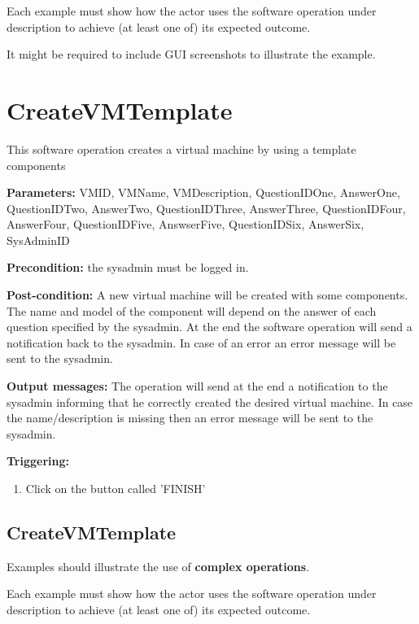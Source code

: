 Each example must show how the actor uses the software operation under
description to achieve (at least one of) its expected outcome.

It might be required to include GUI screenshots to illustrate the example.





\section{CreateVMTemplate}
\label{operation:CreateVMTemplate}
This software operation creates a virtual machine by using a template
components
\begin{description}

\item \textbf{Parameters:} VMID, VMName, VMDescription, QuestionIDOne,
AnswerOne, QuestionIDTwo, AnswerTwo, QuestionIDThree, AnswerThree,
QuestionIDFour, AnswerFour, QuestionIDFive, AnswserFive, QuestionIDSix,
AnswerSix, SysAdminID
\item \textbf{Precondition:} the sysadmin must be logged in.
\item \textbf{Post-condition:} A new virtual machine will be created with some
components. The name and model of the component will depend on the answer of
each question specified by the sysadmin. At the end the software operation will
send a notification back to the sysadmin. In case of an error an error message
will be sent to the sysadmin.
\item \textbf{Output messages:} The operation will send at the end a
notification to the sysadmin informing that he correctly created the desired
virtual machine. In case the name/description is missing then an error message
will be sent to the sysadmin.

\item \textbf{Triggering:}
\begin{enumerate}
\item Click on the button called 'FINISH'
\end{enumerate}

 
\end{description}

\subsection{CreateVMTemplate}
Examples should illustrate the use of \textbf{complex operations}.

Each example must show how the actor uses the software operation under
description to achieve (at least one of) its expected outcome.

